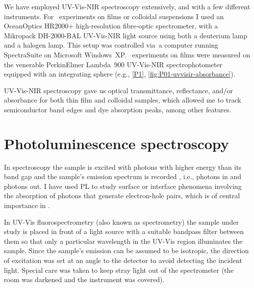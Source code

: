 \documentclass[draft,webedition,openright,titles,swedish,english]{LuaUUThesis}\usepackage[]{graphicx}\usepackage[]{xcolor}
\newcommand{\ie}{i.e.}
\newcommand{\eg}{e.g.}
\newcommand{\via}{via}
\begin{document}
We have employed \gls{UV-Vis-NIR} spectroscopy extensively, and with a few
different instruments.
For \insitu\ experiments on films or colloidal suspensions I used an
OceanOptics HR2000+ high-resolution fibre-optic spectrometer,
with a Mikropack DH-2000-BAL \gls{UV-Vis-NIR} light source using
both a deuterium lamp and a halogen lamp.
This setup was controlled \via\ a computer running SpectraSuite on Microsoft Windows~XP.
\Exsitu\ experiments on films were measured on the venerable PerkinElmer Lambda~900
\gls{UV-Vis-NIR} spectrophotometer equipped with an integrating sphere
(\eg, \cref{P1}, \cref{fig:P01-uvvisir-absorbance}).

\Gls{UV-Vis-NIR} spectroscopy gave us optical transmittance, reflectance, and/or absorbance
for both thin film and colloidal samples, which allowed me to track semiconductor band edges
and dye absorption peaks, among other features.



\section{Photoluminescence spectroscopy}
\label{methods:photolum}

In  spectroscopy the sample is excited with photons with higher
energy than its band gap and the sample's emission spectrum is recorded \cite{Pazoki2020},
\ie, photons in and photons out.
I have used \gls{PL} to study surface or interface phenomena involving
the absorption of photons that generate electron-hole pairs, which is of central
importance in  \cite{Kundu2011a}.

In \gls{UV-Vis} fluorospectrometry (also known as  spectrometry)
the sample under study is placed in front of a light source with a suitable bandpass filter
between them so that only a particular wavelength in the \gls{UV-Vis} region illuminates the sample.
Since the sample's emission can be assumed to be isotropic, the direction of excitation was set at
an angle to the detector to avoid detecting the incident light.
Special care was taken to keep stray light out of the spectrometer
(the room was darkened and the instrument was covered).
\end{document}

